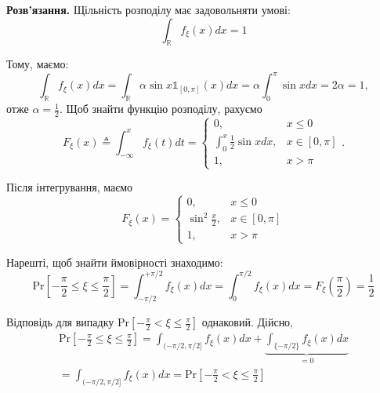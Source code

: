 \documentclass[oneside,solution]{karazin-prob-theory-assign}
\begin{document}
\textbf{Розв'язання.} Щільність розподілу має задовольняти умові:
\begin{equation}
    \int_{\mathbb{R}}f_{\xi}(x)dx = 1
\end{equation}

Тому, маємо:
\begin{equation}
    \int_{\mathbb{R}}f_{\xi}(x)dx = \int_{\mathbb{R}}\alpha \sin x \mathds{1}_{[0,\pi]}(x)dx = \alpha\int_0^{\pi} \sin x dx = 2\alpha = 1,
\end{equation}
отже $\boxed{\alpha=\frac{1}{2}}$. Щоб знайти функцію розподілу, рахуємо
\begin{equation}
    F_{\xi}(x) \triangleq \int_{-\infty}^x f_{\xi}(t)dt = \begin{cases}
        0, & x \leq 0 \\
        \int_0^x \frac{1}{2}\sin x dx, & x \in [0,\pi] \\
        1, & x > \pi
    \end{cases}.
\end{equation}

Після інтегрування, маємо
\begin{equation}
    \boxed{F_{\xi}(x) = \begin{cases}
        0, & x \leq 0 \\
        \sin^2 \frac{x}{2}, & x \in [0,\pi] \\
        1, & x > \pi
    \end{cases}}
\end{equation}

Нарешті, щоб знайти ймовірності знаходимо:
\begin{equation}
    \text{Pr}\left[-\frac{\pi}{2} \leq \xi \leq \frac{\pi}{2}\right] = \int_{-\pi/2}^{+\pi/2}f_{\xi}(x)dx = \int_0^{\pi/2}f_{\xi}(x)dx = F_{\xi}\left(\frac{\pi}{2}\right) = \boxed{\frac{1}{2}}
\end{equation}

Відповідь для випадку $\text{Pr}\left[-\frac{\pi}{2} < \xi \leq \frac{\pi}{2}\right]$ однаковий. Дійсно,
\begin{align}
    \text{Pr}\left[-\frac{\pi}{2} \leq \xi \leq \frac{\pi}{2}\right] = \int_{(-\pi/2,\pi/2]}f_{\xi}(x)dx + \underbrace{\int_{\{-\pi/2\}}f_{\xi}(x)dx}_{=0} \nonumber \\
    = \int_{(-\pi/2,\pi/2]}f_{\xi}(x)dx = \text{Pr}\left[-\frac{\pi}{2} < \xi \leq \frac{\pi}{2}\right]
\end{align}

\end{document}
